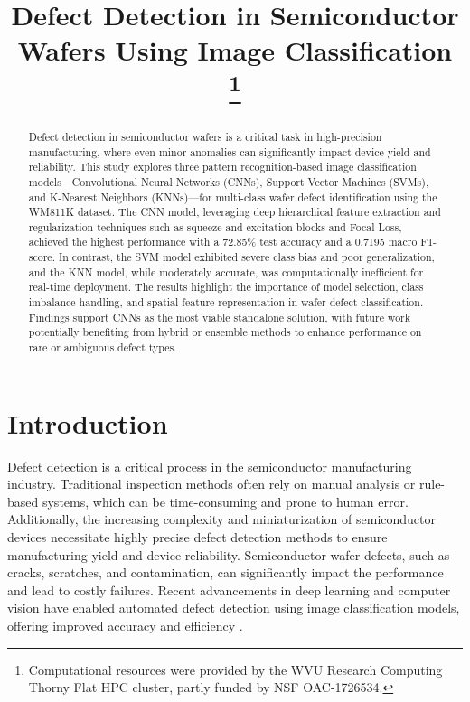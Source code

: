 \documentclass[conference]{IEEEtran}
\begin{document}
\title{
    Defect Detection in Semiconductor Wafers Using Image Classification
    \thanks{Computational resources were provided by the WVU Research Computing Thorny Flat HPC cluster, partly funded by NSF OAC-1726534.}
}

\author{
}

\maketitle
\thispagestyle{plain}
\pagestyle{plain}

\begin{abstract}
    Defect detection in semiconductor wafers is a critical task in high-precision manufacturing, where even minor anomalies can significantly impact device yield and reliability. 
    This study explores three pattern recognition-based image classification models—Convolutional Neural Networks (CNNs), Support Vector Machines (SVMs), and K-Nearest Neighbors (KNNs)—for multi-class wafer defect identification using the WM811K dataset. 
    The CNN model, leveraging deep hierarchical feature extraction and regularization techniques such as squeeze-and-excitation blocks and Focal Loss, achieved the highest performance with a 72.85\% test accuracy and a 0.7195 macro F1-score. 
    In contrast, the SVM model exhibited severe class bias and poor generalization, and the KNN model, while moderately accurate, was computationally inefficient for real-time deployment. 
    The results highlight the importance of model selection, class imbalance handling, and spatial feature representation in wafer defect classification. 
    Findings support CNNs as the most viable standalone solution, with future work potentially benefiting from hybrid or ensemble methods to enhance performance on rare or ambiguous defect types.
\end{abstract}

\section{Introduction}
Defect detection is a critical process in the semiconductor manufacturing industry. 
Traditional inspection methods often rely on manual analysis or rule-based systems, which can be time-consuming and prone to human error.
Additionally, the increasing complexity and miniaturization of semiconductor devices necessitate highly precise defect detection methods to ensure manufacturing yield and device reliability.
Semiconductor wafer defects, such as cracks, scratches, and contamination, can significantly impact the performance and lead to costly failures. 
Recent advancements in deep learning and computer vision have enabled automated defect detection using image classification models, offering improved accuracy and efficiency \cite{b1}.
\end{document}
